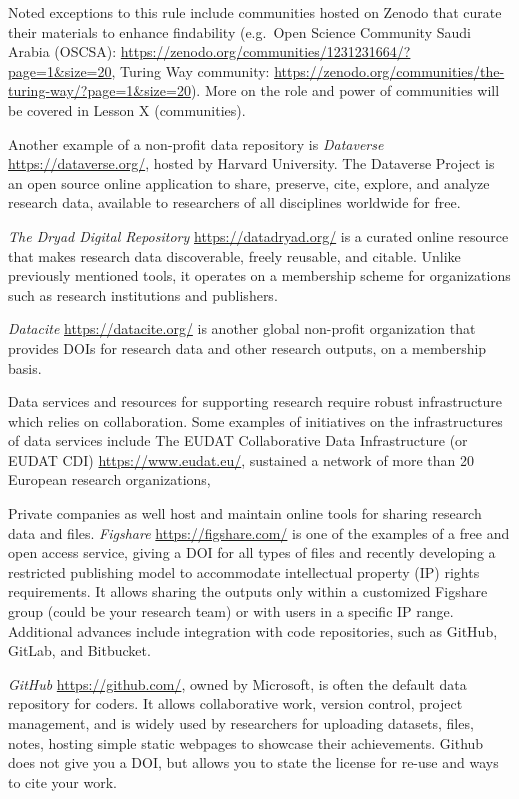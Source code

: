 \documentclass[
  letterpaper,
  DIV=11,
  numbers=noendperiod]{scrreport}
\begin{document}
Noted exceptions to this rule include communities hosted on Zenodo that
curate their materials to enhance findability (e.g.~Open Science
Community Saudi Arabia (OSCSA):
\url{https://zenodo.org/communities/1231231664/?page=1\&size=20}, Turing
Way community:
\url{https://zenodo.org/communities/the-turing-way/?page=1\&size=20}).
More on the role and power of communities will be covered in Lesson X
(communities).

Another example of a non-profit data repository is \emph{Dataverse}
\url{https://dataverse.org/}, hosted by Harvard University. The
Dataverse Project is an open source online application to share,
preserve, cite, explore, and analyze research data, available to
researchers of all disciplines worldwide for free.

\emph{The Dryad Digital Repository} \url{https://datadryad.org/} is a
curated online resource that makes research data discoverable, freely
reusable, and citable. Unlike previously mentioned tools, it operates on
a membership scheme for organizations such as research institutions and
publishers.

\emph{Datacite }\url{https://datacite.org/} is another global non-profit
organization that provides DOIs for research data and other research
outputs, on a membership basis.

Data services and resources for supporting research require robust
infrastructure which relies on collaboration. Some examples of
initiatives on the infrastructures of data services include The EUDAT
Collaborative Data Infrastructure (or EUDAT CDI)
\url{https://www.eudat.eu/}, sustained a network of more than 20
European research organizations,

Private companies as well host and maintain online tools for sharing
research data and files. \emph{Figshare} \url{https://figshare.com/} is
one of the examples of a free and open access service, giving a DOI for
all types of files and recently developing a restricted publishing model
to accommodate intellectual property (IP) rights requirements. It allows
sharing the outputs only within a customized Figshare group (could be
your research team) or with users in a specific IP range. Additional
advances include integration with code repositories, such as GitHub,
GitLab, and Bitbucket.

\emph{GitHub} \url{https://github.com/}, owned by Microsoft, is often
the default data repository for coders. It allows collaborative work,
version control, project management, and is widely used by researchers
for uploading datasets, files, notes, hosting simple static webpages to
showcase their achievements. Github does not give you a DOI, but allows
you to state the license for re-use and ways to cite your work.
\end{document}
